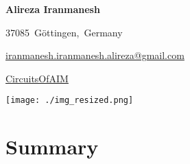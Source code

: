 \documentclass[10pt, letterpaper]{article}
\newenvironment{header}{
        \setlength{\topsep}{0pt}\par\kern\topsep\centering\color{primaryColor}\linespread{1.5}
    }{
        \par\kern\topsep
    } %
\let\hrefWithoutArrow\href
\renewcommand{\href}[2]{\hrefWithoutArrow{#1}{\mbox{\ifthenelse{\equal{#2}{}}{ }{#2 }\raisebox{.15ex}{\footnotesize \faExternalLink*}}}}
\begin{document}
    \begin{minipage}[c]{0.7\textwidth}
        \begin{header}
            \fontsize{30 pt}{30 pt}
    
            \raggedright
            \textbf{Alireza Iranmanesh}
    
    
            \vspace{0.3 cm}
            
            \normalsize
           \mbox{{\small\faMapMarker*}\hspace*{0.13cm}37085 Göttingen, Germany}
             
             \mbox{\hrefWithoutArrow{mailto:iranmanesh.iranmanesh.alireza@gmail.com}{{\small\faEnvelope[regular]}\hspace*{0.13cm}iranmanesh.iranmanesh.alireza@gmail.com}}
            
    
            \mbox{\hrefWithoutArrow{https://github.com/CircuitsOfAIM}{{\small\faGithub}\hspace*{0.13cm}CircuitsOfAIM}}
            
        \end{header}  
    \end{minipage}%
    \begin{minipage}[c]{0.23\textwidth}
      \begin{center}
        \texttt{[image: ./img\_resized.png]} %
      \end{center}
    \end{minipage}

    \vspace{0.3 cm}

    \section{Summary}
\end{document}

